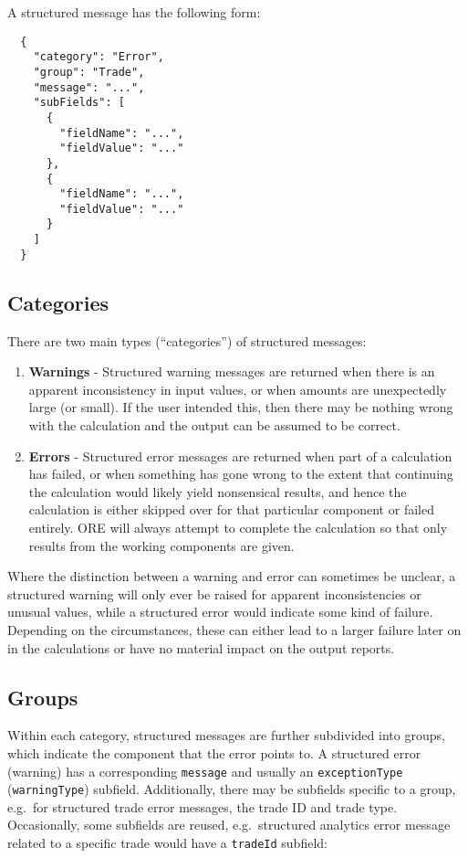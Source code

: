 A structured message has the following form:

\begin{verbatim}
  {
    "category": "Error",
    "group": "Trade",
    "message": "...",
    "subFields": [
      {
        "fieldName": "...",
        "fieldValue": "..."
      },
      {
        "fieldName": "...",
        "fieldValue": "..."
      }
    ]
  }
\end{verbatim}


\subsection{Categories}

There are two main types (``categories'') of structured messages:
\begin{enumerate}
  \item \textbf{Warnings} - Structured warning messages are returned when there is an apparent inconsistency in input values, or when
  amounts are unexpectedly large (or small). If the user intended this, then there may be nothing wrong with the calculation and the
  output can be assumed to be correct.
  \item \textbf{Errors} - Structured error messages are returned when part of a calculation has failed, or when something has gone
  wrong to the extent that continuing the calculation would likely yield nonsensical results, and hence the calculation is either skipped
  over for that particular component or failed entirely. ORE will always attempt to complete the calculation so that only results from the
  working components are given.
\end{enumerate}
Where the distinction between a warning and error can sometimes be unclear, a structured warning will only ever be raised for apparent
inconsistencies or unusual values, while a structured error would indicate some kind of failure. Depending on the circumstances,
these can either lead to a larger failure later on in the calculations or have no material impact on the output reports.


\subsection{Groups}

Within each category, structured messages are further subdivided into groups, which indicate the component that the error points to.
A structured error (warning) has a corresponding \lstinline!message! and usually an \lstinline!exceptionType! (\lstinline!warningType!)
subfield. Additionally, there may be subfields specific to a group, e.g.\ for structured trade error messages, the trade ID and trade
type. Occasionally, some subfields are reused, e.g.\ structured analytics error message related to a specific trade would have a \lstinline!tradeId! subfield:

